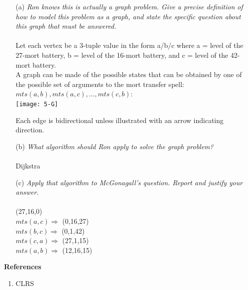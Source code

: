 \documentclass[12pt]{article} \setlength{\oddsidemargin}{0in}
\begin{document}
\begin{enumerate}
\item[(a)]{\textit{Ron knows this is actually a graph problem. Give a
      precise definition of how to model this problem as a graph, and
      state the specific question about this graph that must be
      answered.}}
  \\\\
  Let each vertex be a 3-tuple value in the form a/b/c where a = level of the 27-mort battery, b = level of the 16-mort battery, and c = level of the 42-mort battery. \\
  A graph can be made of the possible states that can be obtained by one of the possible set of arguments to the mort transfer spell: $mts(a,b), mts(a,c), ... , mts(c,b)$: \\
  \texttt{[image: 5-G]}

  Each edge is bidirectional unless illustrated with an arrow indicating direction. 
  \pagebreak
\item[(b)]{\textit{What algorithm should Ron apply to solve the graph
      problem?}}
  \\\\
  Dijkstra
  \\
\item[(c)]{\textit{Apply that algorithm to McGonagall’s
      question. Report and justify your answer.}}
  \\\\
(27,16,0) \\
$ mts(a,c) \Rightarrow$ (0,16,27) \\
$ mts(b,c) \Rightarrow$ (0,1,42) \\
$ mts(c,a) \Rightarrow$ (27,1,15) \\
$ mts(a,b) \Rightarrow$ (12,16,15)

\end{enumerate}
  
  \newpage

\textbf{References} \\
\hrulefill
\begin{enumerate}
  \item CLRS
\end{enumerate}
\end{document}
